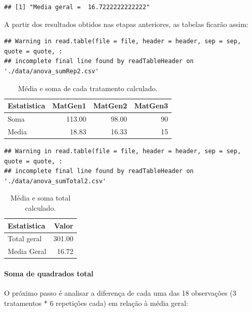 \documentclass[
]{article}
\begin{document}
\begin{verbatim}
## [1] "Media geral =  16.7222222222222"
\end{verbatim}

A partir dos resultados obtidos nas etapas anteriores, as tabelas ficarão assim:

\begin{verbatim}
## Warning in read.table(file = file, header = header, sep = sep, quote = quote, :
## incomplete final line found by readTableHeader on './data/anova_sumRep2.csv'
\end{verbatim}

\begin{table}

\caption{\label{tab:unnamed-chunk-13}Média e soma de cada tratamento calculado.}
\centering
\begin{tabular}[t]{l|r|r|r}
\hline
Estatistica & MatGen1 & MatGen2 & MatGen3\\
\hline
Soma & 113.00 & 98.00 & 90\\
\hline
Media & 18.83 & 16.33 & 15\\
\hline
\end{tabular}
\end{table}

\begin{verbatim}
## Warning in read.table(file = file, header = header, sep = sep, quote = quote, :
## incomplete final line found by readTableHeader on './data/anova_sumTotal2.csv'
\end{verbatim}

\begin{table}

\caption{\label{tab:unnamed-chunk-14}Média e soma total calculado.}
\centering
\begin{tabular}[t]{l|r}
\hline
Estatistica & Valor\\
\hline
Total geral & 301.00\\
\hline
Media Geral & 16.72\\
\hline
\end{tabular}
\end{table}

\hypertarget{soma-de-quadrados-total}{%
\paragraph{Soma de quadrados total}\label{soma-de-quadrados-total}}

O próximo passo é analisar a diferença de cada uma das 18 observações (3 tratamentos * 6 repetições cada) em relação à média geral:
\end{document}

